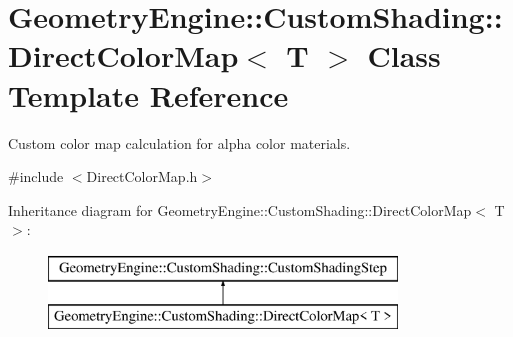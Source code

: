\hypertarget{class_geometry_engine_1_1_custom_shading_1_1_direct_color_map}{}\section{Geometry\+Engine\+::Custom\+Shading\+::Direct\+Color\+Map$<$ T $>$ Class Template Reference}
\label{class_geometry_engine_1_1_custom_shading_1_1_direct_color_map}


Custom color map calculation for alpha color materials.  




{\ttfamily \#include $<$Direct\+Color\+Map.\+h$>$}

Inheritance diagram for Geometry\+Engine\+::Custom\+Shading\+::Direct\+Color\+Map$<$ T $>$\+:\begin{figure}[H]
\begin{center}
\leavevmode
\includegraphics[height=2.000000cm]{class_geometry_engine_1_1_custom_shading_1_1_direct_color_map}
\end{center}
\end{figure}
